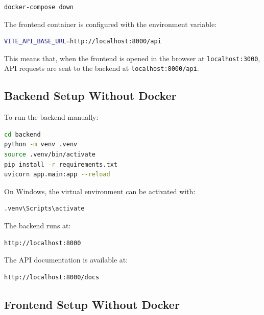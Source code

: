 \begin{lstlisting}[language=bash,label={lst:stop-docker}]
docker-compose down
\end{lstlisting}

\noindent The frontend container is configured with the environment variable:

\begin{lstlisting}[language=bash,label={lst:frontend-env}]
VITE_API_BASE_URL=http://localhost:8000/api
\end{lstlisting}

\noindent This means that, when the frontend is opened in the browser at \texttt{localhost:3000}, API requests are sent to the backend at \texttt{localhost:8000/api}.

\subsection{Backend Setup Without Docker} \label{subsec:backend-setup-without-docker}

To run the backend manually:

\begin{lstlisting}[language=bash,label={lst:run-backend}]
cd backend
python -m venv .venv
source .venv/bin/activate
pip install -r requirements.txt
uvicorn app.main:app --reload
\end{lstlisting}

\noindent On Windows, the virtual environment can be activated with:

\begin{lstlisting}[language=bash,label={lst:create-venv-window}]
.venv\Scripts\activate
\end{lstlisting}

\noindent The backend runs at:

\begin{lstlisting}[language=bash,label={lst:backend-link}]
http://localhost:8000
\end{lstlisting}

\noindent The API documentation is available at:

\begin{lstlisting}[language=bash,label={lst:api-doc-link}]
http://localhost:8000/docs
\end{lstlisting}

\subsection{Frontend Setup Without Docker} \label{subsec:frontend-setup-without-docker}

